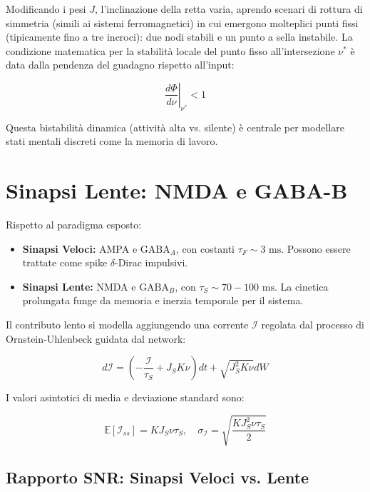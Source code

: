 Modificando i pesi $J$, l'inclinazione della retta varia, aprendo scenari di rottura di simmetria (simili ai sistemi ferromagnetici) in cui emergono molteplici punti fissi (tipicamente fino a tre incroci): due nodi stabili e un punto a sella instabile.
La condizione matematica per la stabilità locale del punto fisso all'intersezione $\nu^*$ è data dalla pendenza del guadagno rispetto all'input:

\begin{equation}
\left. \frac{d\Phi}{d\nu} \right|_{\nu^*} < 1
\end{equation}

Questa bistabilità dinamica (attività alta vs. silente) è centrale per modellare stati mentali discreti come la memoria di lavoro.

\section{Sinapsi Lente: NMDA e GABA-B}

Rispetto al paradigma esposto:
\begin{itemize}
    \item \textbf{Sinapsi Veloci:} AMPA e $\text{GABA}_A$, con costanti $\tau_F \sim 3\text{ ms}$. Possono essere trattate come spike $\delta$-Dirac impulsivi.
    \item \textbf{Sinapsi Lente:} NMDA e $\text{GABA}_B$, con $\tau_S \sim 70-100\text{ ms}$. La cinetica prolungata funge da memoria e inerzia temporale per il sistema.
\end{itemize}


Il contributo lento si modella aggiungendo una corrente $\mathcal{I}$ regolata dal processo di Ornstein-Uhlenbeck guidata dal network:

\begin{equation}
d\mathcal{I} = \left(-\frac{\mathcal{I}}{\tau_S} + J_S K \nu\right)dt + \sqrt{J_S^2 K \nu} dW
\end{equation}

I valori asintotici di media e deviazione standard sono:

\begin{equation}
\mathbb{E}[\mathcal{I}_{ss}] = K J_S \nu \tau_S, \quad \sigma_{\mathcal{I}} = \sqrt{\frac{K J_S^2 \nu \tau_S}{2}}
\end{equation}

\subsection{Rapporto SNR: Sinapsi Veloci vs. Lente}

